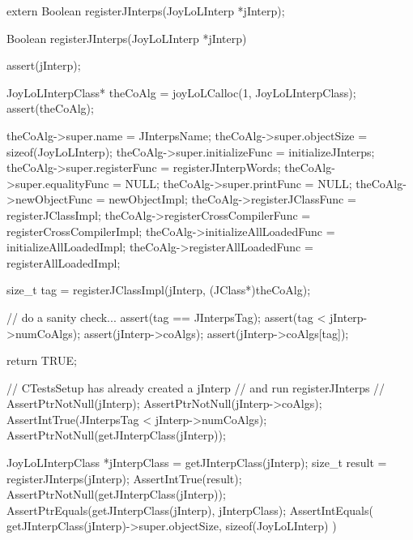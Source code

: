 \startTestSuite[regiserJInterps]

\startCHeader
extern Boolean registerJInterps(JoyLoLInterp *jInterp);
\stopCHeader
{}

\startCCode
Boolean registerJInterps(JoyLoLInterp *jInterp) {
  assert(jInterp);
  
  JoyLoLInterpClass* theCoAlg =
    joyLoLCalloc(1, JoyLoLInterpClass);
  assert(theCoAlg);
  
  theCoAlg->super.name             = JInterpsName;
  theCoAlg->super.objectSize       = sizeof(JoyLoLInterp);
  theCoAlg->super.initializeFunc   = initializeJInterps;
  theCoAlg->super.registerFunc     = registerJInterpWords;
  theCoAlg->super.equalityFunc     = NULL;
  theCoAlg->super.printFunc        = NULL;
  theCoAlg->newObjectFunc          = newObjectImpl;
  theCoAlg->registerJClassFunc     = registerJClassImpl;
  theCoAlg->registerCrossCompilerFunc =
    registerCrossCompilerImpl;
  theCoAlg->initializeAllLoadedFunc =
    initializeAllLoadedImpl;
  theCoAlg->registerAllLoadedFunc =
    registerAllLoadedImpl;
    
  size_t tag =     
    registerJClassImpl(jInterp, (JClass*)theCoAlg);
  
  // do a sanity check...
  assert(tag == JInterpsTag);
  assert(tag < jInterp->numCoAlgs);
  assert(jInterp->coAlgs);
  assert(jInterp->coAlgs[tag]);
    
  return TRUE;
}
\stopCCode


\startCTest
  // CTestsSetup has already created a jInterp 
  // and run registerJInterps
  //
  AssertPtrNotNull(jInterp);
  AssertPtrNotNull(jInterp->coAlgs);
  AssertIntTrue(JInterpsTag < jInterp->numCoAlgs);
  AssertPtrNotNull(getJInterpClass(jInterp));
  
  JoyLoLInterpClass *jInterpClass = getJInterpClass(jInterp);
  size_t result = registerJInterps(jInterp);
  AssertIntTrue(result);
  AssertPtrNotNull(getJInterpClass(jInterp));
  AssertPtrEquals(getJInterpClass(jInterp), jInterpClass);
  AssertIntEquals(
    getJInterpClass(jInterp)->super.objectSize,
    sizeof(JoyLoLInterp)
  )
\stopCTest
\stopTestCase
\stopTestSuite


